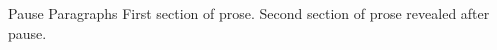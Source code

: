 \documentclass[14pt,t]{beamer-accessibility}
\begin{document}
\begin{frame}{Pause Paragraphs}
First section of prose.
\pause
Second section of prose revealed after pause.
\end{frame}
\end{document}
